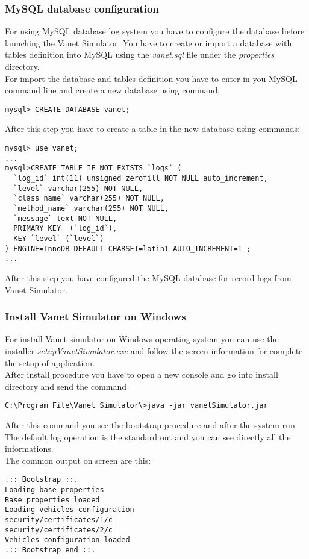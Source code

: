 \subsubsection{MySQL database configuration}
For using MySQL database log system you have to configure the database before launching the Vanet Simulator. You have to create or import a database with tables definition into MySQL using the \textit{vanet.sql} file under the \textit{properties} directory.\\
For import the database and tables definition you have to enter in you MySQL command line and create a new database using command:
\begin{verbatim}
mysql> CREATE DATABASE vanet;
\end{verbatim}
After this step you have to create a table in the new database using commands:
\begin{verbatim}
mysql> use vanet;
...
mysql>CREATE TABLE IF NOT EXISTS `logs` (
  `log_id` int(11) unsigned zerofill NOT NULL auto_increment,
  `level` varchar(255) NOT NULL,
  `class_name` varchar(255) NOT NULL,
  `method_name` varchar(255) NOT NULL,
  `message` text NOT NULL,
  PRIMARY KEY  (`log_id`),
  KEY `level` (`level`)
) ENGINE=InnoDB DEFAULT CHARSET=latin1 AUTO_INCREMENT=1 ;
...
\end{verbatim}
After this step you have configured the MySQL database for record logs from Vanet Simulator.
\subsubsection{Install Vanet Simulator on Windows}
For install Vanet simulator on Windows operating system you can use the installer \textit{setupVanetSimulator.exe} and follow the screen information for complete the setup of application.\\
After install procedure you have to open a new console and go into install directory and send the command
\begin{verbatim}
C:\Program File\Vanet Simulator\>java -jar vanetSimulator.jar
\end{verbatim}
After this command you see the bootstrap procedure and after the system run. The default log operation is the standard out and you can see directly all the informations.\\
The common output on screen are this:
\begin{verbatim}
.:: Bootstrap ::.
Loading base properties
Base properties loaded
Loading vehicles configuration
security/certificates/1/c
security/certificates/2/c
Vehicles configuration loaded
.:: Bootstrap end ::.
\end{verbatim}
